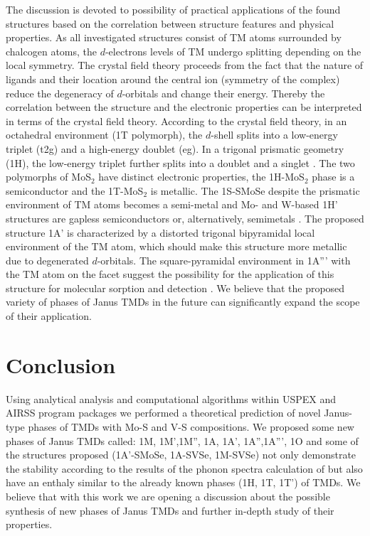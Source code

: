\documentclass[a4paperm]{article}
\begin{document}
The discussion is devoted to possibility of practical applications of the found structures based on the correlation between structure features and physical properties. As all investigated structures consist of TM atoms surrounded by chalcogen atoms, the $d$-electrons levels of TM undergo splitting depending on the local symmetry. The crystal field theory proceeds from the fact that the nature of ligands and their location around the central ion (symmetry of the complex) reduce the degeneracy of $d$-orbitals and change their energy. Thereby the correlation between the structure and the electronic properties can be interpreted in terms of the crystal field theory.
According to the crystal field theory, in an octahedral environment (1T polymorph), the $d$-shell splits into a low-energy triplet (t2g) and a high-energy doublet (eg). In a trigonal prismatic geometry (1H), the low-energy triplet further splits into a doublet and a singlet \cite{pasquier2019crystal}. 
The two polymorphs of MoS$_2$ have distinct electronic properties, the 1H-MoS$_2$ phase is a semiconductor and the 1T-MoS$_2$ is metallic. The 1S-SMoSe despite the prismatic environment of TM atoms becomes a semi-metal \cite{lai2021catalytic, tang2021lattice} and Mo- and W-based 1H' structures are gapless semiconductors or, alternatively, semimetals \cite{ma2016two}. 
The proposed structure 1A' is characterized by a distorted trigonal bipyramidal local environment of the TM atom, which should make this structure more metallic due to degenerated $d$-orbitals. 
The square-pyramidal environment in 1A''' with the TM atom on the facet suggest the possibility for the application of this structure for molecular sorption and detection \cite{nano12050774}.
We believe that the proposed variety of phases of Janus TMDs in the future can significantly expand the scope of their application.

\section{Conclusion}
Using analytical analysis and computational algorithms within USPEX and AIRSS program packages we performed a theoretical prediction of novel Janus-type phases of TMDs with Mo-S and V-S compositions. We proposed some new phases of Janus TMDs called: 1M, 1M',1M'', 1A, 1A', 1A'',1A''', 1O and some of the structures proposed (1A'-SMoSe, 1A-SVSe, 1M-SVSe) not only demonstrate the stability according to the results of the phonon spectra calculation of but also have an enthaly similar to the already known phases (1H, 1T, 1T') of TMDs. We believe that with this work we are opening a discussion about the possible synthesis of new phases of Janus TMDs and further in-depth study of their properties.
\end{document}
